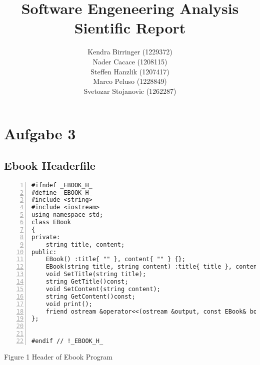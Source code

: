 \documentclass{llncs}
\begin{document}
\makeatletter
\renewcommand\subsubsection{\@startsection{subsubsection}{2}{\z@}%
                       {-18\p@ \@plus -4\p@ \@minus -4\p@}%
                       {\lineskip}%
                       {\normalfont\normalsize\bfseries\boldmath}}
\makeatother


\title{Software Engeneering Analysis Sientific Report}

\author{Kendra Birringer (1229372) \\ Nader Cacace (1208115) \\ Steffen Hanzlik (1207417) \\ Marco Peluso (1228849) \\ Svetozar Stojanovic (1262287)}


\maketitle              %


\section{Aufgabe 3}
\subsection{Ebook Headerfile}

\begin{lstlisting}[basicstyle=\footnotesize\ttfamily, numbers=left, stepnumber=1, numberstyle = \normalsize]
#ifndef _EBOOK_H_
#define _EBOOK_H_
#include <string>
#include <iostream>
using namespace std;
class EBook
{
private:
	string title, content; 
public:
	EBook() :title{ "" }, content{ "" } {};
	EBook(string title, string content) :title{ title }, content{ content }{};
	void SetTitle(string title);
	string GetTitle()const;
	void SetContent(string content);
	string GetContent()const;
	void print();
	friend ostream &operator<<(ostream &output, const EBook& book);
};


#endif // !_EBOOK_H_

\end{lstlisting}
\footnotesize{Figure 1 Header of Ebook Program}\newline
\end{document}
